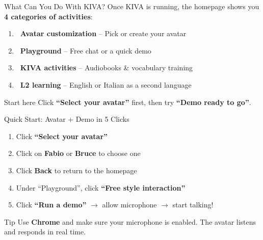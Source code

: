 \documentclass[aspectratio=169]{beamer}
\begin{document}

\begin{frame}{What Can You Do With KIVA?}
Once KIVA is running, the homepage shows you \textbf{4 categories of activities}:

\vspace{0.3cm}

\begin{enumerate}
    \setlength\itemsep{0.4cm}
    \item \textbf{\faUserFriends\ Avatar customization} -- Pick or create your avatar
    \item \textbf{\faGamepad\ Playground} -- Free chat or a quick demo
    \item \textbf{\faBookReader\ KIVA activities} -- Audiobooks \& vocabulary training
    \item \textbf{\faGlobe\ L2 learning} -- English or Italian as a second language
\end{enumerate}

\vspace{0.3cm}

\begin{block}{Start here}
Click \textbf{``Select your avatar''} first, then try \textbf{``Demo ready to go''}.
\end{block}
\end{frame}

\begin{frame}{Quick Start: Avatar + Demo in 5 Clicks}
\begin{enumerate}
    \setlength\itemsep{0.5cm}
    \item Click \textbf{``Select your avatar''}
    \item Click on \textbf{Fabio} or \textbf{Bruce} to choose one
    \item Click \textbf{Back} to return to the homepage
    \item Under ``Playground'', click \textbf{``Free style interaction''}
    \item Click \textbf{``Run a demo''} $\rightarrow$ allow microphone $\rightarrow$ start talking!
\end{enumerate}

\vspace{0.3cm}

\begin{block}{Tip}
Use \textbf{Chrome} and make sure your microphone is enabled. The avatar listens and responds in real time.
\end{block}
\end{frame}
\end{document}
